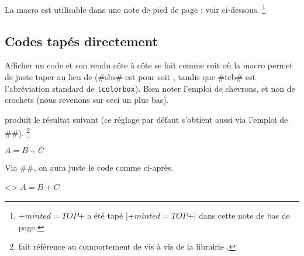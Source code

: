 \begin{tdocnote}
    La macro  est utilisable dans une note de pied de page : voir ci-dessous.%
    \footnote{
        \tdoclatexin+$minted = TOP$+ a été tapé \tdoclatexin|\tdoclatexin+$minted = TOP$+| dans cette note de bas de page.
    }
\end{tdocnote}



\subsection{Codes tapés directement}

\begin{tdocexa}
    Afficher un code et son rendu côte à côte se fait comme suit où la macro  permet de juste taper  au lieu de  (\tdoclatexin#sbs# est pour  soit , tandis que \tdoclatexin#tcb# est l'abréviation standard de \texttt{tcolorbox}). Bien noter l'emploi de chevrons, et non de crochets (nous revenons sur ceci un plus bas).

\end{tdocexa}


\begin{tdocexa}[À la suite]
     produit le résultat suivant (ce réglage par défaut s'obtient aussi via l'emploi de \tdoclatexin##).%
    \footnote{
         fait référence au comportement  de  vis à vis de la librairie .
    }

    \begin{tdoclatex}
$A = B + C$
    \end{tdoclatex}
\end{tdocexa}


\begin{tdocexa}
    Via \tdoclatexin##, on aura juste le code comme ci-après.

    \begin{tdoclatex}<>
$A = B + C$
    \end{tdoclatex}
\end{tdocexa}


